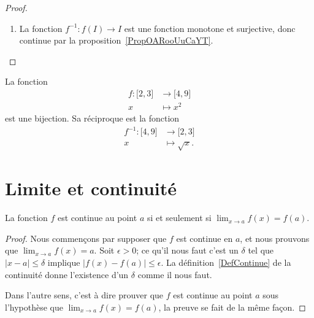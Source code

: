 \begin{proof}
\begin{enumerate}
\item

    La fonction \( f^{-1}\colon f(I)\to I\) est une fonction monotone et surjective, donc continue par la proposition~\ref{PropOARooUuCaYT}.

    \end{enumerate}
\end{proof}

\begin{example}
    La fonction
    \begin{equation}
        \begin{aligned}
            f\colon \mathopen[ 2 , 3 \mathclose]&\to \mathopen[ 4 , 9 \mathclose] \\
            x&\mapsto x^2
        \end{aligned}
    \end{equation}
    est une bijection. Sa réciproque est la fonction
    \begin{equation}
        \begin{aligned}
            f^{-1}\colon \mathopen[ 4 , 9 \mathclose]&\to \mathopen[ 2 , 3 \mathclose] \\
            x&\mapsto \sqrt{x}.
        \end{aligned}
    \end{equation}
\end{example}

\section{Limite et continuité}
\label{SecLimiteFontion}

\begin{theorem}           \label{ThoLimCont}
La fonction $f$ est continue au point $a$ si et seulement si $\lim_{x\to a}f(x)=f(a)$.
\end{theorem}

\begin{proof}
Nous commençons par supposer que $f$ est continue en $a$, et nous prouvons que $\lim_{x\to a}f(x)=a$. Soit $\epsilon>0$; ce qu'il nous faut c'est un $\delta$ tel que $| x-a |\leq\delta$ implique $| f(x)-f(a) |\leq\epsilon$. La définition~\ref{DefContinue} de la continuité donne l'existence d'un $\delta$ comme il nous faut.

Dans l'autre sens, c'est à dire prouver que $f$ est continue au point $a$ sous l'hypothèse que $\lim_{x\to a}f(x)=f(a)$, la preuve se fait de la même façon.
\end{proof}


